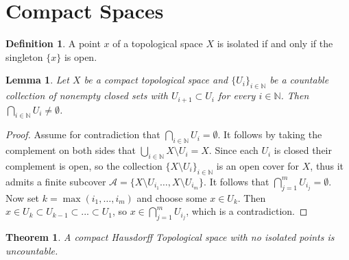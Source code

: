 \documentclass{report}
\newtheorem{theorem}{Theorem}[section]
\newtheorem{lemma}{Lemma}[section]
\theoremstyle{definition}
\newtheorem{definition}{Definition}[section]
\theoremstyle{remark}
\newcommand{\N}{\mathbb{N}}
\newcommand{\set}[1]{\{#1\}}
\newcommand{\prt}[1]{\mathcal{#1}}
\let\oldmax\max
\renewcommand{\max}[1]{\oldmax \left( #1 \right)}
\begin{document}
\setcounter{section}{25}
\section{Compact Spaces}
\begin{definition}
   A point $x$ of a topological space $X$ is isolated if and only if the singleton $\set{x}$ is open.
\end{definition}

\begin{lemma} \label{lem_inter_of_compact_nonempty}
    Let $X$ be a compact topological space and $\set{U_i}_{i \in \N}$ be a countable collection of nonempty closed sets with $U_{i+1} \subset U_i$ for every $i \in \N$. Then $\bigcap_{i \in \N} U_i \neq \emptyset$.
\end{lemma}

\begin{proof}
    Assume for contradiction that $\bigcap_{i \in \N} U_i = \emptyset$. It follows by taking the complement on both sides that $\bigcup_{i \in \N} X \setminus{U_i} = X$. Since each $U_i$ is closed their complement is open, so the collection $\set{X \setminus U_i}_{i \in \N}$ is an open cover for $X$, thus it admits a finite subcover $\prt{A} = \set{X \setminus U_{i_1} \dots, X \setminus U_{i_m}}$. It follows that $\bigcap_{j=1}^m U_{i_j} = \emptyset$. Now set $k = \max{i_1, \dots, i_m}$ and choose some $x \in U_k$. Then $x \in U_k \subset U_{k-1} \subset ... \subset U_1$, so $x \in \bigcap_{j=1}^m U_{i_j}$, which is a contradiction.
\end{proof}

\begin{theorem}
    A compact Hausdorff Topological space with no isolated points is uncountable.
\end{theorem}
\end{document}
